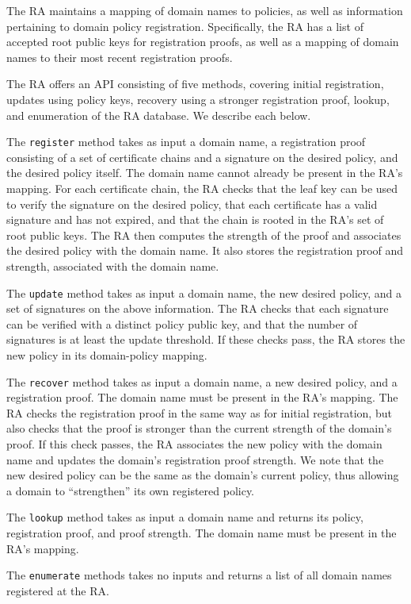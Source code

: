 The RA maintains a mapping of domain names to policies, as well as information
pertaining to domain policy registration. Specifically, the RA has a list of
accepted root public keys for registration proofs, as well as a mapping of
domain names to their most recent registration proofs.

The RA offers an API consisting of five methods, covering initial registration,
updates using policy keys, recovery using a stronger registration proof, lookup,
and enumeration of the RA database. We describe each below. 

The \texttt{register} method takes as input a domain name, a registration proof
consisting of a set of certificate chains and a signature on the desired policy,
and the desired policy itself. The domain name cannot already be present in the
RA's mapping. For each certificate chain, the RA checks that the leaf key can be
used to verify the signature on the desired policy, that each certificate has a
valid signature and has not expired, and that the chain is rooted in the RA's
set of root public keys. The RA then computes the strength of the proof and
associates the desired policy with the domain name. It also stores the
registration proof and strength, associated with the domain name.

The \texttt{update} method takes as input a domain name, the new desired policy,
and a set of signatures on the above information. The RA checks that each
signature can be verified with a distinct policy public key, and that the number
of signatures is at least the update threshold. If these checks pass, the RA
stores the new policy in its domain-policy mapping.

The \texttt{recover} method takes as input a domain name, a new desired policy,
and a registration proof. The domain name must be present in the RA's mapping.
The RA checks the registration proof in the same way as for initial
registration, but also checks that the proof is stronger than the current
strength of the domain's proof. If this check passes, the RA associates the new
policy with the domain name and updates the domain's registration proof
strength. We note that the new desired policy can be the same as the domain's
current policy, thus allowing a domain to ``strengthen'' its own registered
policy.

The \texttt{lookup} method takes as input a domain name and returns its policy,
registration proof, and proof strength. The domain name must be present in the
RA's mapping.

The \texttt{enumerate} methods takes no inputs and returns a list of all domain
names registered at the RA.
